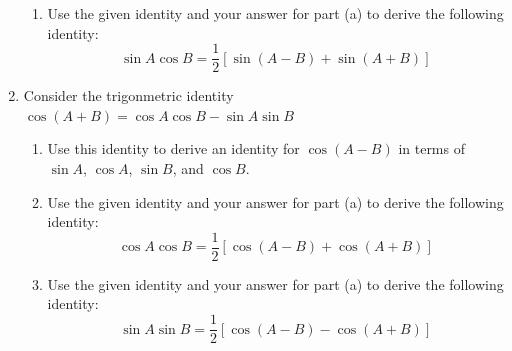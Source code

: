 \documentclass[12pt]{article}
\newif\ifans
\begin{document}
\begin{enumerate}
\begin{enumerate}
\item Use the given identity and your answer for part (a) to derive the following identity: $$\sin{A}\cos{B}=\frac{1}{2}\left[\sin{(A-B)}+\sin{(A+B)}\right]$$

\ifans{\fbox{\parbox{1\linewidth}{Adding the given identity to the identity from part (a) and then dividing both sides by 2 yields the desired result.}}} \fi

\end{enumerate}

\item Consider the trigonmetric identity $\cos{(A+B)}=\cos{A}\cos{B}-\sin{A}\sin{B}$

\begin{enumerate}

\item Use this identity to derive an identity for $\cos{(A-B)}$ in terms of $\sin{A}$, $\cos{A}$, $\sin{B}$, and $\cos{B}$.

\ifans{\fbox{$\cos{(A-B)}=\cos{A}\cos{B}+\sin{A}\sin{B}$}} \fi

\item Use the given identity and your answer for part (a) to derive the following identity: $$\cos{A}\cos{B}=\frac{1}{2}\left[\cos{(A-B)}+\cos{(A+B)}\right]$$

\ifans{\fbox{\parbox{1\linewidth}{Adding the given identity to the identity from part (a) and then dividing both sides by 2 yields the desired result.}}} \fi

\item Use the given identity and your answer for part (a) to derive the following identity: $$\sin{A}\sin{B}=\frac{1}{2}\left[\cos{(A-B)}-\cos{(A+B)}\right]$$

\ifans{\fbox{\parbox{1\linewidth}{Subtracting the given identity from the identity from part (a) and then dividing both sides by 2 yields the desired result.}}} \fi

\end{enumerate}

\end{enumerate}

\end{document}
